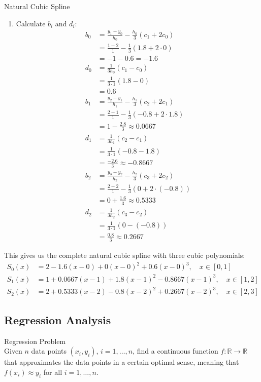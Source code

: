 \begin{example2}{Natural Cubic Spline}
\begin{enumerate}
    \item Calculate $b_i$ and $d_i$:
    \begin{align*}
    b_0 &= \frac{y_1-y_0}{h_0} - \frac{h_0}{3}(c_1 + 2c_0)\\
    &= \frac{1-2}{1} - \frac{1}{3}(1.8 + 2 \cdot 0)\\
    &= -1 - 0.6 = -1.6\\
    d_0 &= \frac{1}{3h_0}(c_1 - c_0)\\
    &= \frac{1}{3 \cdot 1}(1.8 - 0)\\
    &= 0.6\\
    b_1 &= \frac{y_2-y_1}{h_1} - \frac{h_1}{3}(c_2 + 2c_1)\\
    &= \frac{2-1}{1} - \frac{1}{3}(-0.8 + 2 \cdot 1.8)\\
    &= 1 - \frac{2.8}{3} \approx 0.0667\\
    d_1 &= \frac{1}{3h_1}(c_2 - c_1)\\
    &= \frac{1}{3 \cdot 1}(-0.8 - 1.8)\\
    &= \frac{-2.6}{3} \approx -0.8667\\
    b_2 &= \frac{y_3-y_2}{h_2} - \frac{h_2}{3}(c_3 + 2c_2)\\
    &= \frac{2-2}{1} - \frac{1}{3}(0 + 2 \cdot (-0.8))\\
    &= 0 + \frac{1.6}{3} \approx 0.5333\\
    d_2 &= \frac{1}{3h_2}(c_3 - c_2)\\
    &= \frac{1}{3 \cdot 1}(0 - (-0.8))\\
    &= \frac{0.8}{3} \approx 0.2667
    \end{align*}
\end{enumerate}

This gives us the complete natural cubic spline with three cubic polynomials:
\begin{align*}
S_0(x) &= 2 - 1.6(x-0) + 0(x-0)^2 + 0.6(x-0)^3, \quad x \in [0,1]\\
S_1(x) &= 1 + 0.0667(x-1) + 1.8(x-1)^2 - 0.8667(x-1)^3, \quad x \in [1,2]\\
S_2(x) &= 2 + 0.5333(x-2) - 0.8(x-2)^2 + 0.2667(x-2)^3, \quad x \in [2,3]
\end{align*}
\end{example2}

\subsection{Regression Analysis}

\begin{definition}{Regression Problem}\\
Given $n$ data points $(x_i, y_i)$, $i=1,\ldots,n$, find a continuous function $f: \mathbb{R} \rightarrow \mathbb{R}$ that approximates the data points in a certain optimal sense, meaning that $f(x_i) \approx y_i$ for all $i=1,\ldots,n$.
\end{definition}

